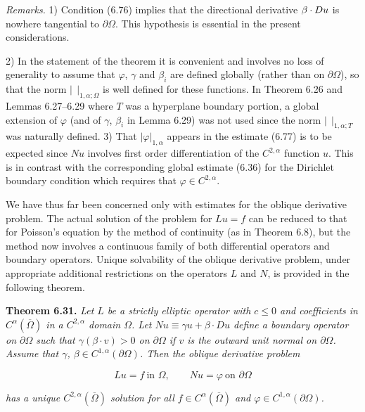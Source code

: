 \medskip

\noindent\textit{Remarks.}
1) Condition (6.76) implies that the directional derivative $\beta\cdot D u$ is
nowhere tangential to $\partial\Omega$. This hypothesis is essential in the present considerations.

2) In the statement of the theorem it is convenient and involves no loss of generality
to assume that $\varphi$, $\gamma$ and $\beta_i$ are defined globally (rather than on $\partial\Omega$), so that the
norm $|\ \ |_{1,\alpha;\Omega}$ is well defined for these functions. In Theorem 6.26 and Lemmas
6.27--6.29 where $T$ was a hyperplane boundary portion, a global extension of
$\varphi$ (and of $\gamma$, $\beta_i$ in Lemma 6.29) was not used since the norm $|\ \ |_{1,\alpha;T}$ was naturally
defined. 3) That $|\varphi|_{1,\alpha}$ appears in the estimate (6.77) is to be expected since $Nu$
involves first order differentiation of the $C^{2,\alpha}$ function $u$. This is in contrast with
the corresponding global estimate (6.36) for the Dirichlet boundary condition
which requires that $\varphi\in C^{2,\alpha}$.



We have thus far been concerned only with estimates for the oblique derivative problem. The actual solution of the problem for $Lu=f$ can be reduced to that for Poisson's equation by the method of continuity (as in Theorem 6.8), but the method now involves a continuous family of both differential operators and boundary operators. Unique solvability of the oblique derivative problem, under appropriate additional restrictions on the operators $L$ and $N$, is provided in the following theorem.

\noindent\textbf{Theorem 6.31.} \textit{Let $L$ be a strictly elliptic operator with $c\leq 0$ and coefficients in $C^{\alpha}(\overline{\Omega})$ in a $C^{2,\alpha}$ domain $\Omega$. Let $Nu \equiv \gamma u + \beta\cdot Du$ define a boundary operator on $\partial\Omega$ such that $\gamma(\beta\cdot v)>0$ on $\partial\Omega$ if $v$ is the outward unit normal on $\partial\Omega$. Assume that $\gamma$, $\beta \in C^{1,\alpha}(\partial\Omega)$. Then the oblique derivative problem}

\begin{equation}
\tag{6.78}
Lu=f \ \text{in }\Omega, \qquad Nu=\varphi \ \text{on }\partial\Omega
\end{equation}

\textit{has a unique $C^{2,\alpha}(\overline{\Omega})$ solution for all $f\in C^{\alpha}(\overline{\Omega})$ and $\varphi\in C^{1,\alpha}(\partial\Omega)$.}

